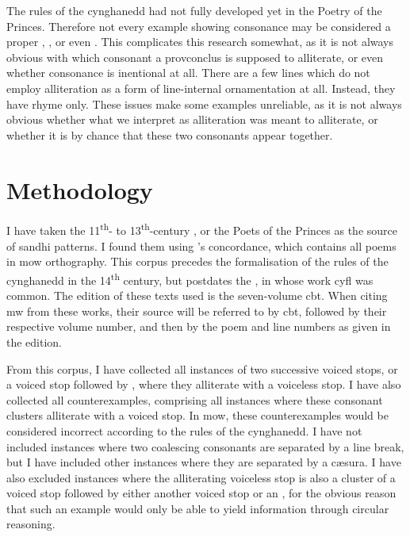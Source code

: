 The rules of the cynghanedd had not fully developed yet in the Poetry of the Princes. Therefore not every example showing consonance may be considered a proper , ,  or even . This complicates this research somewhat, as it is not always obvious with which consonant a \gls{provconclus} is supposed to alliterate, or even whether consonance is inentional at all. There are a few lines which do not employ alliteration as a form of line-internal ornamentation at all. Instead, they have rhyme only. These issues make some examples unreliable, as it is not always obvious whether what we interpret as alliteration was meant to alliterate, or whether it is by chance that these two consonants appear together.

\section{Methodology}
\label{sec:methodology}

I have taken the 11\textsuperscript{th}- to 13\textsuperscript{th}-century , or the Poets of the Princes as the source of sandhi patterns. I found them using \textcite{parry_owen_concordans_????}'s concordance, which contains all poems in \gls{mow} orthography. This corpus precedes the formalisation of the rules of the cynghanedd in the 14\textsuperscript{th} century, but postdates the , in whose work \gls{cyfl} was common. The edition of these texts used is the seven-volume \gls{cbt}. When citing \gls{mw} from these works, their source will be referred to by \acrshort{cbt}, followed by their respective volume number, and then by the poem and line numbers as given in the edition.  

From this corpus, I have collected all instances of two successive voiced stops, or a voiced stop followed by , where they alliterate with a voiceless stop. I have also collected all counterexamples, comprising all instances where these consonant clusters alliterate with a voiced stop. In \gls{mow}, these counterexamples would be considered incorrect according to the rules of the cynghanedd. I have not included instances where two coalescing consonants are separated by a line break, but I have included other instances where they are separated by a cæsura. I have also excluded instances where the alliterating voiceless stop is also a cluster of a voiced stop followed by either another voiced stop or an , for the obvious reason that such an example would only be able to yield information through circular reasoning. 

